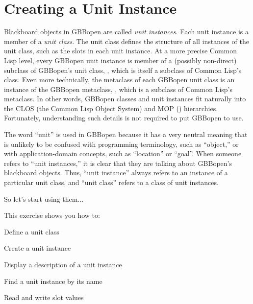 \documentclass[10pt,twoside,english,pdftex]{article}
\begin{document}

\T\markright{}%
\T\pagestyle{plain}
\T\cleardoublepage
\W{}
\T\pagestyle{fancy}
\T\thispagestyle{fancybottom}
\T\renewcommand{\headrulewidth}{0pt}
\section{Creating a Unit Instance}
\label{sec:unit-instance}%

Blackboard objects in GBBopen are called \textit{unit instances}. Each unit
instance is a member of a \textit{unit class}.  The unit class defines the
structure of all instances of the unit class, such as the slots in each unit
instance.  At a more precise Common Lisp level, every GBBopen unit instance is
member of a (possibly non-direct) subclass of GBBopen's unit class,
, which is itself a subclass of Common
Lisp's  class.  Even more technically, the
metaclass of each GBBopen unit class is an instance of the GBBopen metaclass,
, which is a subclass of Common Lisp's
 metaclass.  In other words, GBBopen classes and
unit instances fit naturally into the CLOS (the Common Lisp Object System) and
MOP ()
hierarchies. Fortunately, understanding such details is not required to put
GBBopen to use.

The word ``unit'' is used in GBBopen because it has a very neutral meaning
that is unlikely to be confused with programming terminology, such as
``object,'' or with application-domain concepts, such as ``location'' or
``goal''.  When someone refers to ``unit instances,'' it is clear that they
are talking about GBBopen's blackboard objects.  Thus, ``unit instance''
always refers to an instance of a particular unit class, and ``unit class''
refers to a class of unit instances.

So let's start using them$\ldots$

\fndocrule

This exercise shows you how to:
\begin{tightitemize}
\item Define a unit class
\item Create a unit instance
\item Display a description of a unit instance
\item Find a unit instance by its name
\item Read and write slot values
\end{tightitemize}
\end{document}
